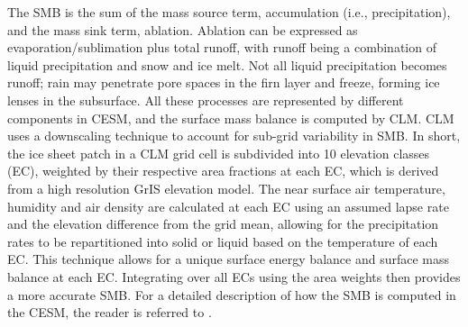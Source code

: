 \documentclass[draft]{agujournal2019}
\begin{document}
The SMB is the sum of the mass source term, accumulation (i.e., precipitation), and the mass sink term, ablation. Ablation can be expressed as evaporation/sublimation plus total runoff, with runoff being a combination of liquid precipitation and snow and ice melt. Not all liquid precipitation becomes runoff; rain may penetrate pore spaces in the firn layer and freeze, forming ice lenses in the subsurface. All these processes are represented by different components in CESM, and the surface mass balance is computed by CLM. CLM uses a downscaling technique to account for sub-grid variability in SMB. In short, the ice sheet patch in a CLM grid cell is subdivided into 10 elevation classes (EC), weighted by their respective area fractions at each EC, which is derived from a high resolution GrIS elevation model. The near surface air temperature, humidity and air density are calculated at each EC using an assumed lapse rate and the elevation difference from the grid mean, allowing for the precipitation rates to be repartitioned into solid or liquid based on the temperature of each EC. This technique allows for a unique surface energy balance and surface mass balance at each EC. Integrating over all ECs using the area weights then provides a more accurate SMB. For a detailed description of how the SMB is computed in the CESM, the reader is referred to \cite{SETAL2019TC,KETAL2020JAMES}.
\end{document}
